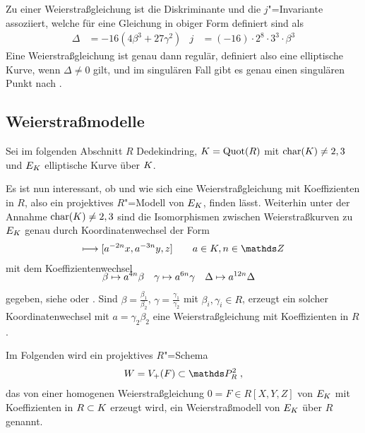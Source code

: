 Zu einer Weierstraßgleichung ist die Diskriminante und die
$j$"=Invariante assoziiert, welche für eine Gleichung in obiger
Form definiert sind als 
\begin{align*}
  \Delta &= -16\left(4\beta^3 + 27\gamma^2\right)
  &j &= (-16)\cdot 2^8\cdot 3^3\cdot\beta^3
\end{align*}
Eine Weierstraßgleichung ist genau dann regulär, definiert also eine
elliptische Kurve, wenn $\Delta\neq 0$ gilt,
und im singulären Fall gibt es genau einen singulären Punkt
nach \cite[Proposition~III.1.4]{silverman}.


\subsection{Weierstraßmodelle}
Sei im folgenden Abschnitt $R$ Dedekindring,
$K=\operatorname{Quot}(R)$ mit $\operatorname{char}(K)\neq2,3$ und $E_{K}$ elliptische Kurve über
$K$.

Es ist nun interessant, ob und wie sich eine Weierstraßgleichung mit
Koeffizienten in $R$, also ein projektives $R$"=Modell von
$E_{K}$, finden lässt.
Weiterhin unter der Annahme ${\operatorname{char}(K)\neq2,3}$ sind die
Isomorphismen zwischen Weierstraßkurven zu $E_{K}$ genau durch
Koordinatenwechsel der Form
\begin{gather*}
  [x,y,z] \longmapsto [a^{-2n}x, a^{-3n}y, z] \qquad a\in\K, n\in\Z
\end{gather*}
mit dem Koeffizientenwechsel
\begin{align*}
  \SwapAboveDisplaySkip
  \beta&\mapsto a^{4n}\beta
  &\gamma&\mapsto a^{6n}\gamma
  &\Delta&\mapsto a^{12n}\Delta
\end{align*}
gegeben, siehe \cite[Lemma~1.5/2]{neron}
oder \cite[Chapter~VII.1]{silverman}.
Sind ${\beta=\frac{\beta_1}{\beta_2}}$,
${\gamma=\frac{\gamma_1}{\gamma_2}}$ mit ${\beta_i,\gamma_i\in R}$,
erzeugt ein solcher Koordinatenwechsel mit ${a=\gamma_2\beta_2}$ eine
Weierstraßgleichung mit Koeffizienten in $R$.
\begin{Definition}[Weierstraßmodell]
  Im Folgenden wird ein projektives $R$"=Schema
  \begin{gather*}
    W=V_+(F)\subset\P_R^2\;,
  \end{gather*}
  das von einer homogenen
  Weierstraßgleichung $0=F\in R[X,Y,Z]$ von $E_{K}$ mit Koeffizienten
  in $R\subset K$ erzeugt wird, ein Weierstraßmodell von $E_{K}$ über
  $R$ genannt.
\end{Definition}

